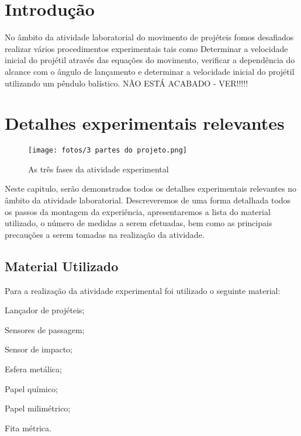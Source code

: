 \documentclass{report}
\begin{document}
\clearpage
{}

\chapter{Introdução}
\label{chap.introducao}

No âmbito da atividade laboratorial do movimento de projéteis fomos desafiados realizar vários procedimentos experimentais tais como Determinar a velocidade inicial do projétil através das equações do movimento, verificar a dependência do alcance com o ângulo de lançamento e determinar a velocidade inicial do projétil utilizando um pêndulo balístico. NÃO ESTÁ ACABADO - VER!!!!!

\chapter{Detalhes experimentais relevantes}
\label{chap.História do BlackJack 21}

\begin{figure}[H]
\centering
\texttt{[image: fotos/3 partes do projeto.png]}
\caption{As três fases da atividade experimental}\cite{blackcapa} %
\end{figure}
Neste capitulo, serão demonstrados todos os detalhes experimentais relevantes no âmbito da atividade laboratorial. Descreveremos de uma forma detalhada todos os passos da montagem da experiência, apresentaremos a lista do material utilizado, o número de medidas a serem efetuadas, bem como as principais precauções a serem tomadas na realização da atividade. 

\section{Material Utilizado}
Para a realização da atividade experimental foi utilizado o seguinte material:
\begin{paragrafoenum}
\item Lançador de projéteis;
\item Sensores de passagem;
\item Sensor de impacto;
\item Esfera metálica;
\item Papel químico;
\item Papel milimétrico;
\item Fita métrica.
\end{paragrafoenum}
\end{document}
